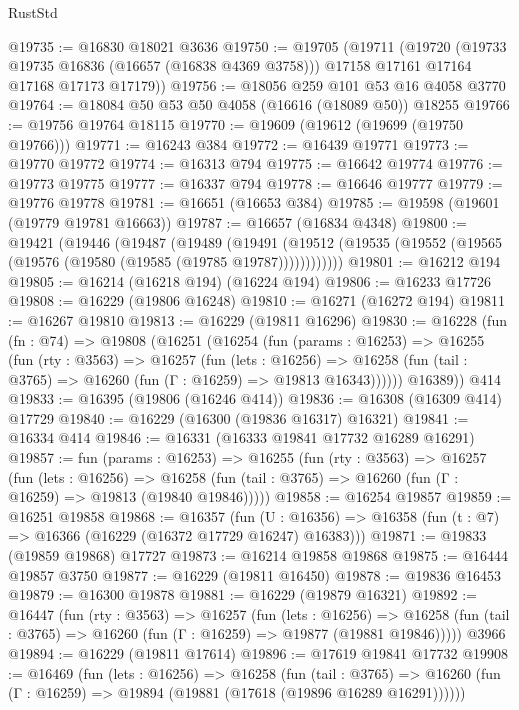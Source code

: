\begin{lexlean}{RustStd}
\begin{coremodule}
@19735 := @16830 @18021 @3636
@19750 := @19705
    (@19711
      (@19720
        (@19733 @19735 @16836 (@16657 (@16838 @4369 @3758)))
        @17158
        @17161
        @17164
        @17168
        @17173
        @17179))
@19756 := @18056 @259 @101 @53 @16 @4058 @3770
@19764 := @18084 @50 @53 @50 @4058 (@16616 (@18089 @50)) @18255
@19766 := @19756 @19764 @18115
@19770 := @19609 (@19612 (@19699 (@19750 @19766)))
@19771 := @16243 @384
@19772 := @16439 @19771
@19773 := @19770 @19772
@19774 := @16313 @794
@19775 := @16642 @19774
@19776 := @19773 @19775
@19777 := @16337 @794
@19778 := @16646 @19777
@19779 := @19776 @19778
@19781 := @16651 (@16653 @384)
@19785 := @19598 (@19601 (@19779 @19781 @16663))
@19787 := @16657 (@16834 @4348)
@19800 := @19421
    (@19446
      (@19487
        (@19489
          (@19491 (@19512 (@19535 (@19552 (@19565 (@19576 (@19580 (@19585 (@19785 @19787))))))))))))
@19801 := @16212 @194
@19805 := @16214 (@16218 @194) (@16224 @194)
@19806 := @16233 @17726
@19808 := @16229 (@19806 @16248)
@19810 := @16271 (@16272 @194)
@19811 := @16267 @19810
@19813 := @16229 (@19811 @16296)
@19830 := @16228
    (fun (fn : @74) =>
    @19808
      (@16251
        (@16254
          (fun (params : @16253) =>
          @16255
            (fun (rty : @3563) =>
            @16257
              (fun (lets : @16256) =>
              @16258 (fun (tail : @3765) => @16260 (fun (Γ : @16259) => @19813 @16343))))))
        @16389))
    @414
@19833 := @16395 (@19806 (@16246 @414))
@19836 := @16308 (@16309 @414) @17729
@19840 := @16229 (@16300 (@19836 @16317) @16321)
@19841 := @16334 @414
@19846 := @16331 (@16333 @19841 @17732 @16289 @16291)
@19857 := fun (params : @16253) =>
  @16255
    (fun (rty : @3563) =>
    @16257
      (fun (lets : @16256) =>
      @16258 (fun (tail : @3765) => @16260 (fun (Γ : @16259) => @19813 (@19840 @19846)))))
@19858 := @16254 @19857
@19859 := @16251 @19858
@19868 := @16357
    (fun (U : @16356) => @16358 (fun (t : @7) => @16366 (@16229 (@16372 @17729 @16247) @16383)))
@19871 := @19833 (@19859 @19868) @17727
@19873 := @16214 @19858 @19868
@19875 := @16444 @19857 @3750
@19877 := @16229 (@19811 @16450)
@19878 := @19836 @16453
@19879 := @16300 @19878
@19881 := @16229 (@19879 @16321)
@19892 := @16447
    (fun (rty : @3563) =>
    @16257
      (fun (lets : @16256) =>
      @16258 (fun (tail : @3765) => @16260 (fun (Γ : @16259) => @19877 (@19881 @19846)))))
    @3966
@19894 := @16229 (@19811 @17614)
@19896 := @17619 @19841 @17732
@19908 := @16469
    (fun (lets : @16256) =>
    @16258
      (fun (tail : @3765) =>
      @16260 (fun (Γ : @16259) => @19894 (@19881 (@17618 (@19896 @16289 @16291))))))

\end{coremodule}
\end{lexlean}

